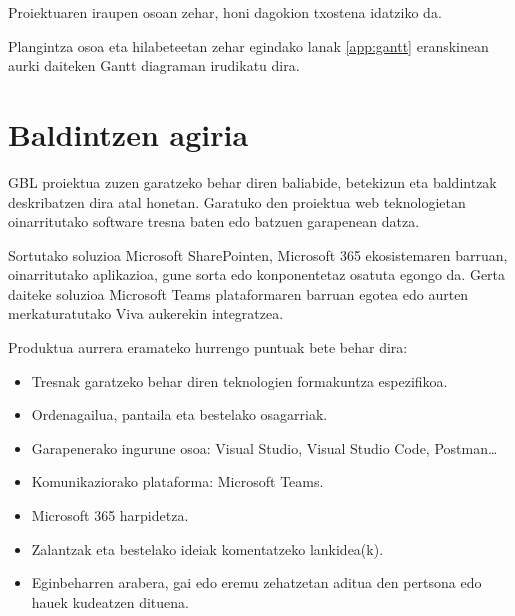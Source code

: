 Proiektuaren iraupen osoan zehar, honi dagokion txostena idatziko da.

Plangintza osoa eta hilabeteetan zehar egindako lanak \ref{app:gantt} eranskinean aurki daiteken Gantt diagraman irudikatu dira.

\section{Baldintzen agiria}\label{sec:baldintzak}
GBL proiektua zuzen garatzeko behar diren baliabide, betekizun eta baldintzak 
deskribatzen dira atal honetan. Garatuko den proiektua web 
teknologietan oinarritutako software tresna baten edo batzuen garapenean datza.

Sortutako soluzioa Microsoft SharePointen, Microsoft 365 ekosistemaren
barruan, oinarritutako aplikazioa, gune sorta edo konponentetaz osatuta egongo 
da. Gerta daiteke soluzioa Microsoft Teams plataformaren barruan egotea edo 
aurten merkaturatutako Viva aukerekin integratzea.

Produktua aurrera eramateko hurrengo puntuak bete behar dira:
\begin{itemize}
    \item Tresnak garatzeko behar diren teknologien formakuntza espezifikoa.
    \item Ordenagailua, pantaila eta bestelako osagarriak.
    \item Garapenerako ingurune osoa: Visual Studio, Visual Studio Code, Postman…
    \item Komunikaziorako plataforma: Microsoft Teams.
    \item Microsoft 365 harpidetza.
    \item Zalantzak eta bestelako ideiak komentatzeko lankidea(k).
    \item Eginbeharren arabera, gai edo eremu zehatzetan aditua den pertsona edo hauek kudeatzen dituena.
\end{itemize}
